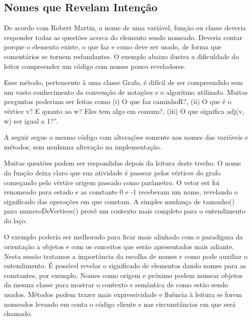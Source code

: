 \subsection{Nomes que Revelam Intenção}
De acordo com Robert Martin, o nome de uma variável, função ou classe deveria responder todas as questões acerca do elemento sendo nomeado. Deveria contar porque o elemento existe, o que faz e como deve ser usado, de forma que comentários se tornem redundantes. O exemplo abaixo ilustra a dificuldade do leitor compreender um código com nomes pouco reveladores.



Esse método, pertencente à uma classe Grafo, é difícil de ser compreendido sem um vasto conhecimento da convenção de notações e o algoritmo utilizado. Muitas perguntas poderiam ser feitas como (i) O que faz caminhoR?,  (ii) O que é o vértice v?  E quanto ao w? Eles tem algo em comum?, (iii)  O que significa adj(v, w) ser igual a 1?”.

A seguir segue o mesmo código com alterações somente nos nomes das variáveis e métodos, sem nenhuma alteração na implementação.



Muitas questões podem ser respondidas depois da leitura deste trecho. O nome da função deixa claro que sua atividade é passear pelos vértices do grafo começando pelo vértice origem passado como parâmetro. O vetor est foi renomeado para estado e as constante 0 e -1 receberam um nome, revelando o significado das operações em que constam. A simples mudança de tamanho() para numeroDeVertices() provê um contexto mais completo para o entendimento do laço.
	
O exemplo poderia ser melhorado para ficar mais alinhado com o paradigma da orientação a objetos e com os conceitos que serão apresentados mais adiante. Nesta sessão tratamos a importância da escolha de nomes e como pode auxiliar o entendimento. É possível revelar o significado de elementos dando nomes para as constantes, por exemplo. Nomes como origem e próximo podem nomear objetos da mesma classe para mostrar o contexto e semântica de como estão sendo usados. Métodos podem trazer mais expressividade e fluência à leitura se forem nomeados levando em conta o código cliente e nas circunstâncias em que será chamado.

